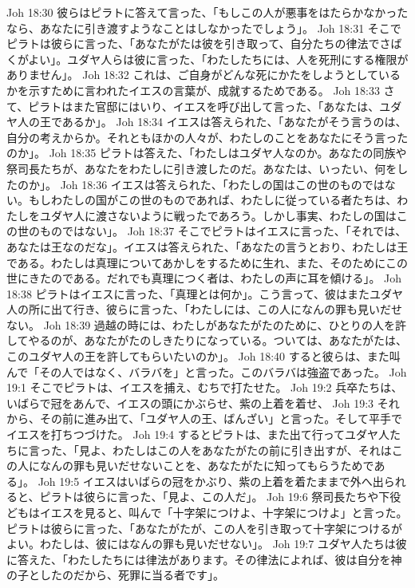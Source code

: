 Joh 18:30  彼らはピラトに答えて言った、「もしこの人が悪事をはたらかなかったなら、あなたに引き渡すようなことはしなかったでしょう」。
Joh 18:31  そこでピラトは彼らに言った、「あなたがたは彼を引き取って、自分たちの律法でさばくがよい」。ユダヤ人らは彼に言った、「わたしたちには、人を死刑にする権限がありません」。
Joh 18:32  これは、ご自身がどんな死にかたをしようとしているかを示すために言われたイエスの言葉が、成就するためである。
Joh 18:33  さて、ピラトはまた官邸にはいり、イエスを呼び出して言った、「あなたは、ユダヤ人の王であるか」。
Joh 18:34  イエスは答えられた、「あなたがそう言うのは、自分の考えからか。それともほかの人々が、わたしのことをあなたにそう言ったのか」。
Joh 18:35  ピラトは答えた、「わたしはユダヤ人なのか。あなたの同族や祭司長たちが、あなたをわたしに引き渡したのだ。あなたは、いったい、何をしたのか」。
Joh 18:36  イエスは答えられた、「わたしの国はこの世のものではない。もしわたしの国がこの世のものであれば、わたしに従っている者たちは、わたしをユダヤ人に渡さないように戦ったであろう。しかし事実、わたしの国はこの世のものではない」。
Joh 18:37  そこでピラトはイエスに言った、「それでは、あなたは王なのだな」。イエスは答えられた、「あなたの言うとおり、わたしは王である。わたしは真理についてあかしをするために生れ、また、そのためにこの世にきたのである。だれでも真理につく者は、わたしの声に耳を傾ける」。
Joh 18:38  ピラトはイエスに言った、「真理とは何か」。こう言って、彼はまたユダヤ人の所に出て行き、彼らに言った、「わたしには、この人になんの罪も見いだせない。
Joh 18:39  過越の時には、わたしがあなたがたのために、ひとりの人を許してやるのが、あなたがたのしきたりになっている。ついては、あなたがたは、このユダヤ人の王を許してもらいたいのか」。
Joh 18:40  すると彼らは、また叫んで「その人ではなく、バラバを」と言った。このバラバは強盗であった。
Joh 19:1  そこでピラトは、イエスを捕え、むちで打たせた。
Joh 19:2  兵卒たちは、いばらで冠をあんで、イエスの頭にかぶらせ、紫の上着を着せ、
Joh 19:3  それから、その前に進み出て、「ユダヤ人の王、ばんざい」と言った。そして平手でイエスを打ちつづけた。
Joh 19:4  するとピラトは、また出て行ってユダヤ人たちに言った、「見よ、わたしはこの人をあなたがたの前に引き出すが、それはこの人になんの罪も見いだせないことを、あなたがたに知ってもらうためである」。
Joh 19:5  イエスはいばらの冠をかぶり、紫の上着を着たままで外へ出られると、ピラトは彼らに言った、「見よ、この人だ」。
Joh 19:6  祭司長たちや下役どもはイエスを見ると、叫んで「十字架につけよ、十字架につけよ」と言った。ピラトは彼らに言った、「あなたがたが、この人を引き取って十字架につけるがよい。わたしは、彼にはなんの罪も見いだせない」。
Joh 19:7  ユダヤ人たちは彼に答えた、「わたしたちには律法があります。その律法によれば、彼は自分を神の子としたのだから、死罪に当る者です」。
